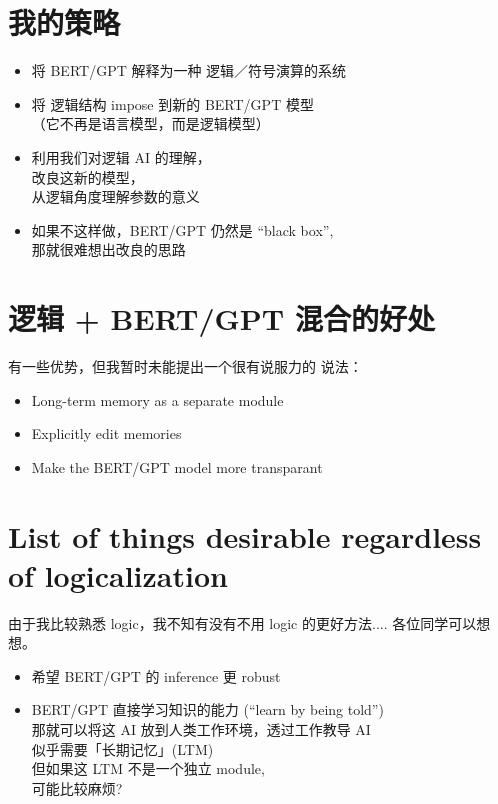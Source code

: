 \setcounter{section}{-1}
\section{我的策略}

\begin{itemize}
	\item 将 BERT/GPT 解释为一种 逻辑／符号演算的系统
	\item 将 逻辑结构 impose 到新的 BERT/GPT 模型 \\
		（它不再是语言模型，而是逻辑模型）
	\item 利用我们对逻辑 AI 的理解， \\
		改良这新的模型，\\
		从逻辑角度理解参数的意义
	\item 如果不这样做，BERT/GPT 仍然是 ``black box'', \\
		那就很难想出改良的思路
\end{itemize}

\section{逻辑 + BERT/GPT 混合的好处}

 有一些优势，但我暂时未能提出一个很有说服力的 说法：
\begin{itemize}
	\item Long-term memory as a separate module
	\item Explicitly edit memories
	\item Make the BERT/GPT model more transparant
\end{itemize}

\section{List of things desirable regardless of logicalization}

由于我比较熟悉 logic，我不知有没有不用 logic 的更好方法.... 各位同学可以想想。

\begin{itemize}
	\item 希望 BERT/GPT 的 inference 更 robust
	\item BERT/GPT 直接学习知识的能力 (``learn by being told'') \\
		那就可以将这 AI 放到人类工作环境，透过工作教导 AI \\
		似乎需要「长期记忆」(LTM) \\
		但如果这 LTM 不是一个独立 module,\\
		可能比较麻烦?
\end{itemize}

